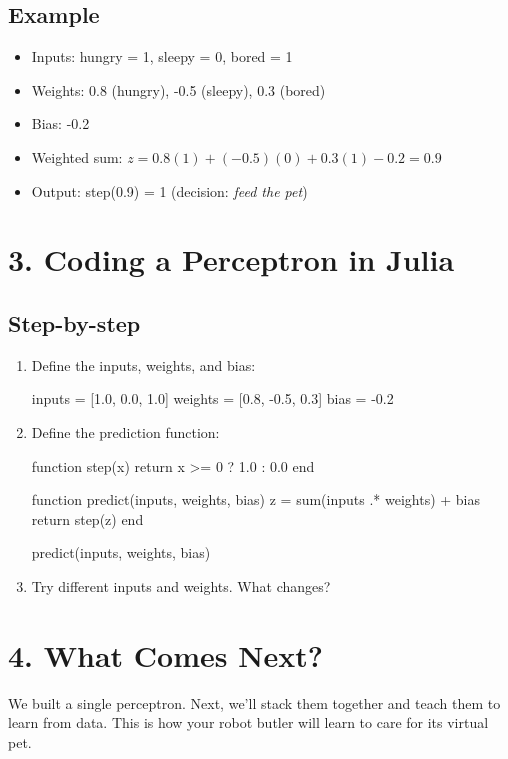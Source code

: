 \documentclass{book}
\begin{document}
\subsection*{Example}
\begin{itemize}
  \item Inputs: hungry = 1, sleepy = 0, bored = 1
  \item Weights: 0.8 (hungry), -0.5 (sleepy), 0.3 (bored)
  \item Bias: -0.2
  \item Weighted sum: $z = 0.8(1) + (-0.5)(0) + 0.3(1) - 0.2 = 0.9$
  \item Output: step(0.9) = 1 \quad (decision: \textit{feed the pet})
\end{itemize}

\section*{3. Coding a Perceptron in Julia}
\subsection*{Step-by-step}
\begin{enumerate}
  \item Define the inputs, weights, and bias:
\begin{julia}
inputs = [1.0, 0.0, 1.0]
weights = [0.8, -0.5, 0.3]
bias = -0.2
\end{julia}

  \item Define the prediction function:
\begin{julia}
function step(x)
    return x >= 0 ? 1.0 : 0.0
end

function predict(inputs, weights, bias)
    z = sum(inputs .* weights) + bias
    return step(z)
end

predict(inputs, weights, bias)
\end{julia}

  \item Try different inputs and weights. What changes?
\end{enumerate}

\section*{4. What Comes Next?}
We built a single perceptron. Next, we'll stack them together and teach them to learn from data. This is how your robot butler will learn to care for its virtual pet.
\end{document}
